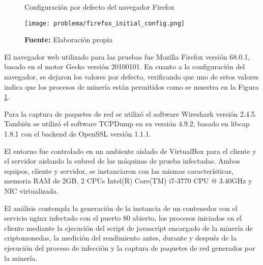 \documentclass[../main/main.tex]{subfiles}
\begin{document}
  \begin{figure}[ht]
    \centering
    \caption{Configuración por defecto del navegador Firefox}
    \texttt{[image: problema/firefox\_initial\_config.png]}
    \caption*{\textbf{Fuente:} Elaboración propia}
    \label{fig:firefox_config_before}
  \end{figure}

  El navegador web utilizado para las pruebas fue Mozilla Firefox versión 68.0.1, basado en el motor Gecko versión 20100101. En cuanto a la configuración del navegador, se dejaron los valores por defecto, verificando que uno de estos valores indica que los procesos de minería están permitidos como se muestra en la Figura \ref{fig:firefox_config_before}.

  Para la captura de paquetes de red se utilizó el software Wireshark versión 2.4.5. También se utilizó el software TCPDump en su versión 4.9.2, basado en libcap 1.8.1 con el backend de OpenSSL versión 1.1.1.

  El entorno fue controlado en un ambiente aislado de VirtualBox para el cliente y el servidor aislando la subred de las máquinas de prueba infectadas. Ambos equipos, cliente y servidor, se instanciaron con las mismas características, memoria RAM de 2GB, 2 CPUs Intel(R) Core(TM) i7-3770 CPU @ 3.40GHz y NIC virtualizada.

  El análisis contempla la generación de la instancia de un contenedor con el servicio nginx infectado con el puerto 80 abierto, los procesos iniciados en el cliente mediante la ejecución del script de javascript encargado de la minería de criptomonedas, la medición del rendimiento antes, durante y después de la ejecución del proceso de infección y la captura de paquetes de red generados por la minería.
\end{document}
